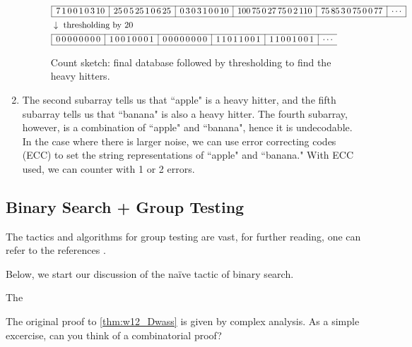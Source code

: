 \begin{enumerate}[label=(\arabic*)]
\begin{figure}[H]
        \centering
        \begin{align*}
        &\begin{array}{|c|c|c|c|c|c|c}
            \hline
            7\,1\,0\,0\,1\,0\,3\,10 &
            25\,0\,5\,25\,1\,0\,6\,25 &
            0\,3\,0\,3\,1\,0\,0\,10 &
            100\,75\,0\,27\,75\,0\,2\,110 &
            75\,85\,3\,0\,75\,0\,0\,77 &
            \cdots \\
            \hline
        \end{array} \\
        &\downarrow \text{ thresholding by 20} \\
        &\begin{array}{|c|c|c|c|c|c}
            \hline
            0\,0\,0\,0\,0\,0\,0\,0 &
            1\,0\,0\,1\,0\,0\,0\,1 &
            0\,0\,0\,0\,0\,0\,0\,0 &
            1\,1\,0\,1\,1\,0\,0\,1 &
            1\,1\,0\,0\,1\,0\,0\,1 &
            \cdots \\
            \hline
        \end{array}
        \end{align*} 
        \caption{Count sketch: final database followed by thresholding to find the heavy hitters.}
        \label{fig:w12_database_summary_2}
    \end{figure}
    \item The second subarray tells us that ``apple" is a heavy hitter, and the fifth subarray tells us that ``banana" is also a heavy hitter. The fourth subarray, however, is a combination of ``apple" and ``banana", hence it is undecodable. In the case where there is larger noise, we can use error correcting codes (ECC) to set the string representations of ``apple" and ``banana." With ECC used, we can counter with 1 or 2 errors.
\end{enumerate}


\subsection{Binary Search + Group Testing}
The tactics and algorithms for group testing are vast, for further reading, one can refer to the references \cite{CombinatorialGT_SparseRecovery,NoisyNonadaptiveGT,Quickly_Decodable_GT}.

{\color{red}Below, we start our discussion of the na\"ive tactic of binary search. }



\begin{theorem}[Dwass] \label{thm:w12_Dwass}
    The 
\end{theorem}

\begin{remark}
    The original proof to \autoref{thm:w12_Dwass} is given by complex analysis. As a simple excercise, can you think of a combinatorial proof?
\end{remark}